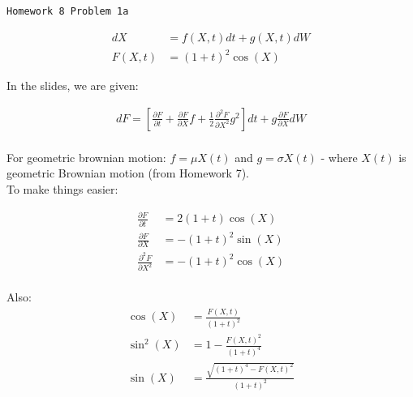 \documentclass[fleqn]{article}
\begin{document}
	\begin{center}
        \Large{\texttt{Homework 8 Problem 1a}} \vspace*{0.8mm}  
	\end{center}

    \begin{align*}
        dX &= f(X,t)dt + g(X,t)dW \\
        F(X,t) &= (1+t)^2 \cos(X) 
    \end{align*}

    In the slides, we are given:

    \begin{align*}
        dF = \left[ \frac{\partial F}{\partial t} + \frac{\partial F}{\partial X} f + \frac{1}{2} \frac{\partial ^2 F}{\partial X^2} g^2 \right]dt + g \frac{\partial F}{\partial X} dW \\
    \end{align*}

    For geometric brownian motion: $f = \mu X(t)$ and $g = \sigma X(t)$ - where $X(t)$ is geometric Brownian motion (from Homework 7). \\

    To make things easier:

    \begin{align*}
        \frac{\partial F}{\partial t} &= 2(1+t) \cos(X) \\
        \frac{\partial F}{\partial X} &= -(1+t)^2 \sin(X) \\
        \frac{\partial^2 F}{\partial X^2} &= -(1+t)^2 \cos(X)\\ 
    \end{align*}

    Also:
    \begin{align*}
        \cos(X) &= \frac{F(X,t)}{(1+t)^2} \\
        \sin^2(X) &= 1 - \frac{F(X,t)^2}{(1+t)^4} \\
        \sin(X) &= \frac{\sqrt{(1+t)^4 - F(X,t)^2} }{(1+t)^2}\\
    \end{align*}
\end{document}

